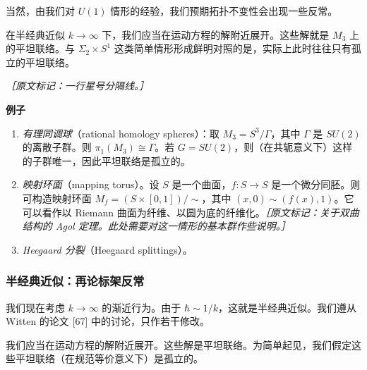 当然，由我们对 $U(1)$ 情形的经验，我们预期拓扑不变性会出现一些反常。

在半经典近似 $k\to\infty$ 下，我们应当在运动方程的解附近展开。这些解就是 $M_3$ 上的平坦联络。与 $\Sigma_2\times S^{1}$ 这类简单情形形成鲜明对照的是，实际上此时往往只有孤立的平坦联络。

{\small\itshape ［原文标记：一行星号分隔线。］}

\textbf{例子}

\begin{enumerate}
  \item \emph{有理同调球}（rational homology spheres）：取 $M_3=S^{3}/\Gamma$，其中 $\Gamma$ 是 $SU(2)$ 的离散子群。则 $\pi_1(M_3)\cong\Gamma$。若 $G=SU(2)$，则（在共轭意义下）这样的子群唯一，因此平坦联络是孤立的。

  \item \emph{映射环面}（mapping torus）。设 $S$ 是一个曲面，$f:S\to S$ 是一个微分同胚。则可构造映射环面 $M_f=(S\times[0,1])/\sim$，其中 $(x,0)\sim(f(x),1)$。它可以看作以 Riemann 曲面为纤维、以圆为底的纤维化。{\small\itshape ［原文标记：关于双曲结构的 Agol 定理。此处需要对这一情形的基本群作些说明。］}

  \item \emph{Heegaard 分裂}（Heegaard splittings）。
\end{enumerate}

\subsubsection{半经典近似：再论标架反常} %

我们现在考虑 $k\to\infty$ 的渐近行为。由于 $\hbar\sim1/k$，这就是半经典近似。我们遵从 Witten 的论文 [67] 中的讨论，只作若干修改。

我们应当在运动方程的解附近展开。这些解是平坦联络。为简单起见，我们假定这些平坦联络（在规范等价意义下）是孤立的。

